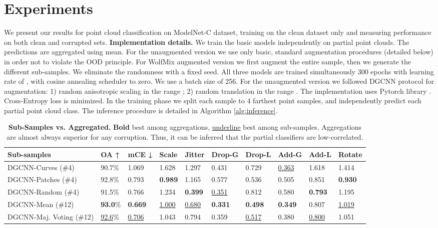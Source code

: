 \documentclass[10pt,twocolumn]{article}
\begin{document}
\section{Experiments}
\label{sec:exp}
We present our results for point cloud classification on ModelNet-C dataset, training on the clean dataset only and measuring performance on both clean and corrupted sets.
{\bf Implementation details.}
 We train the basic models independently on partial point clouds. 
The predictions are aggregated using mean. For the unaugmented version we use only basic, standard augmentation procedures (detailed below) in order not to violate the OOD principle. For WolfMix augmented version we first augment the entire sample, then we generate the different sub-samples.
We eliminate the randomness with a fixed seed. All three models are trained simultaneously 300 epochs with learning rate of , with cosine annealing scheduler \cite{cosine_annealing} to zero. We use a batch size of 256. For the unaugmented version we followed DGCNN \cite{dgcnn} protocol for augmentation: 1) random anisotropic scaling in the range ; 2) random translation in the range . The implementation uses Pytorch library \cite{pytorch}. Cross-Entropy loss is minimized.
In the training phase we split each sample to 4 farthest point samples, and independently predict each partial point cloud class. The inference procedure is detailed in Algorithm \ref{alg:inference}.
\begin{table*}[ht]
  \centering
    \begin{tabular}{p{4cm} || p{1.0cm} p{1.0cm} p{1.0cm} p{1.0cm} p{1.1cm} p{1.1cm} p{1.0cm} p{1.0cm} p{0.8cm}}
    \hline
    Sub-samples & OA ↑ & mCE ↓ & Scale & Jitter & Drop-G & Drop-L & Add-G & Add-L & Rotate \\
    \hline
    DGCNN-Curves (\#4) & 90.7\% & 1.069 & 1.628 & 1.297 & 0.431 & 0.729 & \underline{0.363} & 1.618 & 1.414\\
    DGCNN-Patches (\#4) & 92.8\% & 0.793 & \textbf{0.989} & 1.165 & 0.577 & 0.536 & 0.505 & 0.851 & \textbf{0.930}\\
    DGCNN-Random (\#4) & 91.5\% & 0.766 & 1.234 & \textbf{0.399} & \underline{0.351} & 0.812 & 0.580 & \textbf{0.793} & 1.195\\
    \hline
    DGCNN-Mean (\#12) & \textbf{93.0}\% & \textbf{0.669} & \underline{1.000} &  \underline{0.680} & \textbf{0.331} &  \textbf{0.498} & \textbf{0.349} & 0.807 &  \underline{1.019}\\
    DGCNN-Maj. Voting (\#12) & \underline{92.6}\% & \underline{0.706} & 1.043 &  0.794 & 0.359 &  \underline{0.517} & 0.380 & \underline{0.800} &  1.051\\
    
    \hline
  \end{tabular}
  \caption{\textbf{Sub-Samples vs. Aggregated.} \textbf{Bold} best among aggregations, \underline{underline} best among sub-samples. Aggregations are almost
always superior for any corruption. Thus, it can be inferred that the partial classifiers are low-correlated.}
  \label{table:aggregations}
\end{table*}
\end{document}
